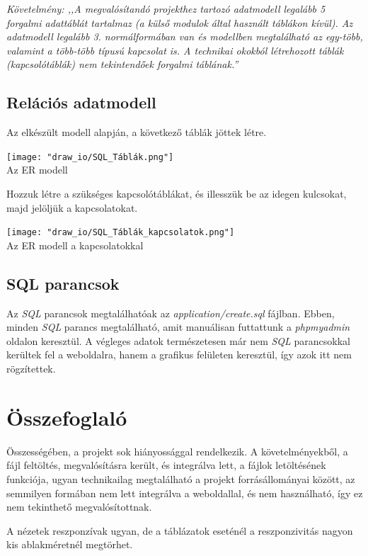 \documentclass[a4paper,12pt]{article}
\begin{document}
\begin{center}
	\textit{{\small Követelmény: ,,A megvalósítandó projekthez tartozó adatmodell legalább 5 forgalmi adattáblát tartalmaz (a külső modulok által használt táblákon kívül). Az adatmodell legalább 3. normálformában van és modellben megtalálható az egy-több, valamint a több-több típusú kapcsolat is. A technikai okokból létrehozott táblák (kapcsolótáblák) nem tekintendőek forgalmi táblának.''}}
\end{center}
\newpage
\subsection{Relációs adatmodell}
Az elkészült modell alapján, a következő táblák jöttek létre.
\begin{center}
	\texttt{[image: "draw\_io/SQL\_Táblák.png"]} \\
	{\small Az ER modell}
\end{center}
Hozzuk létre a szükséges kapcsolótáblákat, és illesszük be az idegen kulcsokat, majd jelöljük a kapcsolatokat.

\begin{center}
	\texttt{[image: "draw\_io/SQL\_Táblák\_kapcsolatok.png"]} \\
	{\small Az ER modell a kapcsolatokkal}
\end{center}
\subsection{SQL parancsok}
Az \textit{SQL} parancsok megtalálhatóak az \textit{application/create.sql} fájlban. Ebben, minden \textit{SQL} parancs megtalálható, amit manuálisan futtattunk a \textit{phpmyadmin} oldalon keresztül. A végleges adatok természetesen már nem \textit{SQL} parancsokkal kerültek fel a weboldalra, hanem a grafikus felületen keresztül, így azok itt nem rögzítettek.
\section{Összefoglaló}
Összességében, a projekt sok hiányossággal rendelkezik. A követelményekből, a fájl feltöltés, megvalósításra került, és integrálva lett, a fájlok letöltésének funkciója, ugyan technikailag megtalálható a projekt forrásállományai között, az semmilyen formában nem lett integrálva a weboldallal, és nem használható, így ez nem tekinthető megvalósítottnak.

A nézetek reszponzívak ugyan, de a táblázatok eseténél a reszponzivitás nagyon kis ablakméretnél megtörhet.
\end{document}
